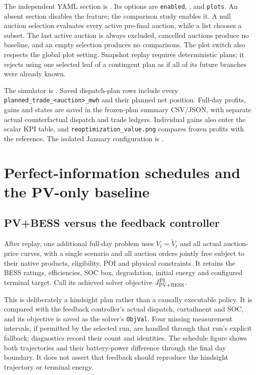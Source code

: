 \documentclass[11pt,a4paper]{article}
\begin{document}
The independent YAML section is .
Its options are \texttt{enabled}, , and \texttt{plots}.
An absent section disables the feature; the comparison study enables it.
A null auction selection evaluates every active pre-final auction, while a
list chooses a subset. The last active auction is always excluded, cancelled
auctions produce no baseline, and an empty selection produces no comparisons.
The plot switch also respects the global plot setting. Snapshot replay requires
deterministic plans; it rejects using one selected leaf of a contingent plan as
if all of its future branches were already known.

The simulator is . Saved dispatch-plan rows
include every \texttt{planned\_trade\_<auction>\_mwh} and their planned net position.
Full-day profits, gains and states are saved in the frozen-plan summary CSV/JSON,
with separate actual counterfactual dispatch and trade ledgers. Individual gains
also enter the scalar KPI table, and \texttt{reoptimization\_value.png} compares
frozen profits with the reference. The isolated January configuration is
.

\section{Perfect-information schedules and the PV-only baseline}

\subsection{PV+BESS versus the feedback controller}
After replay, one additional full-day problem uses $V_t=\widetilde V_t$ and all
actual auction-price curves, with a single scenario and all auction orders
jointly free subject to their native products, eligibility, POI and physical
constraints. It retains the BESS ratings, efficiencies, SOC box, degradation,
initial energy and configured terminal target. Call its achieved solver
objective $J_{\rm PV+BESS}^{\rm PI}$.

This is deliberately a hindsight plan rather than a causally executable policy.
It is compared with the feedback controller's actual dispatch, curtailment and
SOC, and its objective is saved as the solver's \texttt{ObjVal}. Four missing
measurement intervals, if permitted by the selected run, are handled through
that run's explicit fallback; diagnostics record their count and identities.
The schedule figure shows both trajectories and their battery-power difference
through the final day boundary. It does not assert that feedback should reproduce
the hindsight trajectory or terminal energy.
\end{document}
